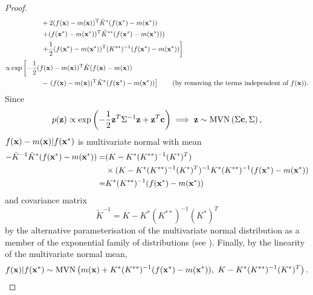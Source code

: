 \begin{proof}
\begin{align*}
                & \hphantom{\exp \left[
        -\frac{1}{2} \left( \right.\right.}
        + 2 (f(\bx)-m(\bx))^\mathrm{T}
        \tilde{K}^{\ast}
        (f(\bx^\ast)-m(\bx^\ast))                                            \\
                & \hphantom{\exp \left[
        -\frac{1}{2} \left( \right.\right.}
        \left.
        + (f(\bx^\ast)-m(\bx^\ast))^\mathrm{T}
        \tilde{K}^{**}
        (f(\bx^\ast)-m(\bx^\ast))
        \right)
        \\
                & \hphantom{\exp \left[
        -\frac{1}{2} \left( \right.\right.}\left.
        + \frac{1}{2} (f(\bx^\ast)-m(\bx^\ast))^\mathrm{T}
        (K^{**})^{-1}
        (f(\bx^\ast)-m(\bx^\ast))
        \right]                                                        \\
        \propto & \exp \left[
        -\frac{1}{2}
        (f(\bx)-m(\bx))^\mathrm{T}
        \tilde{K}
        (f(\bx)-m(\bx))\right.                                         \\
                & \hphantom{\exp \left[
        -\frac{1}{2} \left( \right.\right.}
        -\left.
        (f(\bx)-m(\bx))^\mathrm{T}
        \tilde{K}^{\ast}
        (f(\bx^\ast)-m(\bx^\ast))
        \right] \tag{by removing the terms independent of $f(\bx)$}.
    \end{align*}
    Since
    $$
        p(\mathbf{z})
        \propto \exp\left(
        -\frac{1}{2}\mathbf{z}^T\Sigma^{-1}\mathbf{z}
        + \mathbf{z}^T\mathbf{c}
        \right)
        \implies \mathbf{z} \sim \operatorname{MVN}\left(\Sigma \mathbf{c}, \Sigma\right),
    $$
    $f(\mathbf{x}) - m(\mathbf{x}) | f(\mathbf{x}^\ast)$ is
    multivariate normal with mean
    \begin{align*}
        - \tilde{K}^{-1}\tilde{K}^{\ast}(f(\mathbf{x}^\ast) - m(\mathbf{x}^\ast))
        = & (K - K^{\ast} (K^{**})^{-1} (K^{\ast})^T)                              \\
          & \times(K - K^{\ast} (K^{**})^{-1} (K^{\ast})^T)^{-1} K^{\ast} (K^{**})^{-1}
        (f(\mathbf{x}^\ast) - m(\mathbf{x}^\ast))                                            \\
        = & K^{\ast} (K^{**})^{-1}(f(\mathbf{x}^\ast) - m(\mathbf{x}^\ast))
    \end{align*}
    and covariance matrix
    $$
        \tilde{K}^{-1} = K - K^{\ast} (K^{**})^{-1} (K^{\ast})^T
    $$
    by the alternative parameterisation of the multivariate normal distribution
    as a member of the exponential family of distributions
    (see \cite[Table of Distributions]{noauthor_exponential_2024}).
    Finally, by the linearity of the multivariate normal mean,
    $$
        f(\mathbf{x}) | f(\mathbf{x}^\ast)
        \sim \operatorname{MVN}\left(
        m(\mathbf{x}) + K^{\ast}(K^{**})^{-1}(f(\mathbf{x}^\ast) - m(\mathbf{x}^\ast)), \,\,
        K - K^{\ast}(K^{**})^{-1}(K^{\ast})^T
        \right).
    $$
\end{proof}

